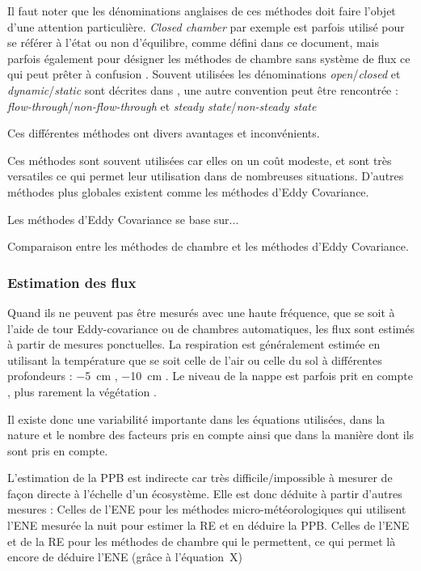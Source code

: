 Il faut noter que les dénominations anglaises de ces méthodes doit faire l'objet d'une attention particulière.
\textit{Closed chamber} par exemple est parfois utilisé pour se référer à l'état ou non d'équilibre, comme défini dans ce document, mais parfois également pour désigner les méthodes de chambre sans système de flux ce qui peut prêter à confusion \cite{pumpanen2004}.
Souvent utilisées les dénominations \textit{open}/\textit{closed} et \textit{dynamic}/\textit{static} sont décrites dans \cite{luo2006161}, une autre convention peut être rencontrée : \textit{flow-through}/\textit{non-flow-through} et \textit{steady state}/\textit{non-steady state} \cite{livingston1995}

Ces différentes méthodes ont divers avantages et inconvénients.

Ces méthodes sont souvent utilisées car elles on un coût modeste, et sont très versatiles ce qui permet leur utilisation dans de nombreuses situations.
D'autres méthodes plus globales existent comme les méthodes d'Eddy Covariance.

Les méthodes d'Eddy Covariance se base sur...

Comparaison entre les méthodes de chambre et les méthodes d'Eddy Covariance.

\subsubsection{Estimation des flux}
Quand ils ne peuvent pas être mesurés avec une haute fréquence, que se soit à l'aide de tour Eddy-covariance ou de chambres automatiques, les flux sont estimés à partir de mesures ponctuelles.
La respiration est généralement estimée en utilisant la température que se soit celle de l'air \citep{bortoluzzi2006} ou celle du sol à différentes profondeurs : \SI{-5}{\centi\metre} \citep{gorres2014,ballantyne2014}, \SI{-10}{\centi\metre} \cite{kim1992,zhu2015}.
Le niveau de la nappe est parfois prit en compte \citep{strack2013,munir2015}, plus rarement la végétation \citep{bortoluzzi2006,karki2015}.

Il existe donc une variabilité importante dans les équations utilisées, dans la nature et le nombre des facteurs pris en compte ainsi que dans la manière dont ils sont pris en compte.

L'estimation de la PPB est indirecte car très difficile/impossible à mesurer de façon directe à l'échelle d'un écosystème.
Elle est donc déduite à partir d'autres mesures :
Celles de l'ENE pour les méthodes micro-météorologiques qui utilisent l'ENE mesurée la nuit pour estimer la RE et en déduire la PPB.
Celles de l'ENE et de la RE pour les méthodes de chambre qui le permettent, ce qui permet là encore de déduire l'ENE (grâce à l'équation~X)


